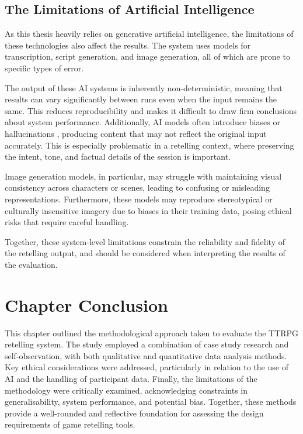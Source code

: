 \subsection*{The Limitations of Artificial Intelligence}
As this thesis heavily relies on generative artificial intelligence, the limitations of these technologies also affect the results. The system uses models for transcription, script generation, and image generation, all of which are prone to specific types of error.

The output of these AI systems is inherently non-deterministic, meaning that results can vary significantly between runs even when the input remains the same. This reduces reproducibility and makes it difficult to draw firm conclusions about system performance. Additionally, AI models often introduce biases \cite{luccioni2023stable} or hallucinations \cite{ji2023survey}, producing content that may not reflect the original input accurately. This is especially problematic in a retelling context, where preserving the intent, tone, and factual details of the session is important.

Image generation models, in particular, may struggle with maintaining visual consistency across characters or scenes, leading to confusing or misleading representations. Furthermore, these models may reproduce stereotypical or culturally insensitive imagery due to biases in their training data, posing ethical risks that require careful handling.

Together, these system-level limitations constrain the reliability and fidelity of the retelling output, and should be considered when interpreting the results of the evaluation.

\section{Chapter Conclusion}
This chapter outlined the methodological approach taken to evaluate the TTRPG retelling system. The study employed a combination of case study research and self-observation, with both qualitative and quantitative data analysis methods. Key ethical considerations were addressed, particularly in relation to the use of AI and the handling of participant data. Finally, the limitations of the methodology were critically examined, acknowledging constraints in generalisability, system performance, and potential bias. Together, these methods provide a well-rounded and reflective foundation for assessing the design requirements of game retelling tools.